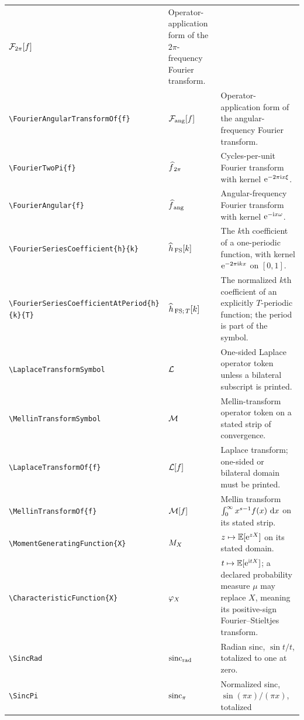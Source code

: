 \documentclass[11pt,oneside]{article}
\theoremstyle{definition}
\theoremstyle{remark}
\DeclareRobustCommand{\commandname}[1]{\texttt{\textbackslash#1}}
\begin{document}
\begin{longtable}{@{}S{0.35\textwidth}L{0.14\textwidth}L{0.45\textwidth}@{}}
$\FourierTwoPiTransformOf{f}$ & Operator-application form of the $2\pi$-frequency
Fourier transform.\\
\commandname{FourierAngularTransformOf}\texttt{\{f\}} &
$\FourierAngularTransformOf{f}$ & Operator-application form of the angular-frequency
Fourier transform.\\
\commandname{FourierTwoPi}\texttt{\{f\}} & $\FourierTwoPi{f}$ & Cycles-per-unit Fourier
transform with kernel $\EulerE^{-2\pi\ImaginaryUnit x\xi}$.\\
\commandname{FourierAngular}\texttt{\{f\}} & $\FourierAngular{f}$ & Angular-frequency
Fourier transform with kernel $\EulerE^{-\ImaginaryUnit x\omega}$.\\
\commandname{FourierSeriesCoefficient}\texttt{\{h\}\{k\}} &
$\FourierSeriesCoefficient{h}{k}$ & The $k$th coefficient of a one-periodic function,
with kernel $\EulerE^{-2\pi\ImaginaryUnit kx}$ on $[0,1]$.\\
\commandname{FourierSeriesCoefficientAtPeriod}\texttt{\{h\}\{k\}\{T\}} &
$\FourierSeriesCoefficientAtPeriod{h}{k}{T}$ & The normalized $k$th coefficient of
an explicitly $T$-periodic function; the period is part of the symbol.\\
\commandname{LaplaceTransformSymbol} & $\LaplaceTransformSymbol$ & One-sided Laplace
operator token unless a bilateral subscript is printed.\\
\commandname{MellinTransformSymbol} & $\MellinTransformSymbol$ & Mellin-transform
operator token on a stated strip of convergence.\\
\commandname{LaplaceTransformOf}\texttt{\{f\}} & $\LaplaceTransformOf{f}$ & Laplace
transform; one-sided or bilateral domain must be printed.\\
\commandname{MellinTransformOf}\texttt{\{f\}} & $\MellinTransformOf{f}$ & Mellin
transform $\int_0^\infty x^{s-1}f(x)\,\Differential x$ on its stated strip.\\
\commandname{MomentGeneratingFunction}\texttt{\{X\}} & $\MomentGeneratingFunction{X}$ &
$z\mapsto\Expectation[\EulerE^{zX}]$ on its stated domain.\\
\commandname{CharacteristicFunction}\texttt{\{X\}} & $\CharacteristicFunction{X}$ &
$t\mapsto\Expectation[\EulerE^{\ImaginaryUnit tX}]$; a declared probability measure
$\mu$ may replace $X$, meaning its positive-sign Fourier--Stieltjes transform.\\
\commandname{SincRad} & $\SincRad$ & Radian sinc, $\sin t/t$, totalized to one at zero.\\
\commandname{SincPi} & $\SincPi$ & Normalized sinc, $\sin(\pi x)/(\pi x)$, totalized

\end{longtable}
\end{document}
